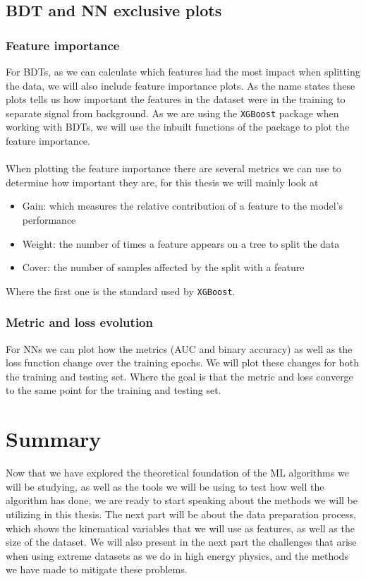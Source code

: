 \documentclass[12pt, a4paper]{book}
\begin{document}
\subsection{BDT and NN exclusive plots}\label{sec:feat}
\subsubsection{Feature importance}
For BDTs, as we can calculate which features had the most impact when splitting the data, we will also include feature importance plots. As the name states these plots tells us how important the features in the dataset were in the training to separate signal from background. As we are using the \verb|XGBoost| 
package when working with BDTs, we will use the inbuilt functions of the package to plot the feature importance. \\
\\When plotting the feature importance there are several metrics we can use to determine how important they are, for this thesis we will mainly look at 
\begin{itemize}
    \item Gain: which measures the relative contribution of a feature to the model's performance
    \item Weight: the number of times a feature appears on a tree to split the data
    \item Cover: the number of samples affected by the split with a feature
\end{itemize}
Where the first one is the standard used by \verb|XGBoost|.

\subsubsection{Metric and loss evolution}
For NNs we can plot how the metrics (AUC and binary accuracy) as well as the loss function change over the training epochs. We will plot these changes for both the training and testing set. Where the goal is that the metric and loss converge to the same point for the training and testing set.
\newpage
\section{Summary}
Now that we have explored the theoretical foundation of the ML algorithms we will be studying, as well as the tools we will be using to test how well the algorithm has done, we are ready to start speaking about the methods we will be utilizing in this thesis. The next part will be about the data preparation process, 
which shows the kinematical variables that we will use as features, as well as the size of the dataset. We will also present in the next part the challenges that arise when using extreme datasets as we do in high energy physics, and the methods we have made to mitigate these problems. 
\end{document}
